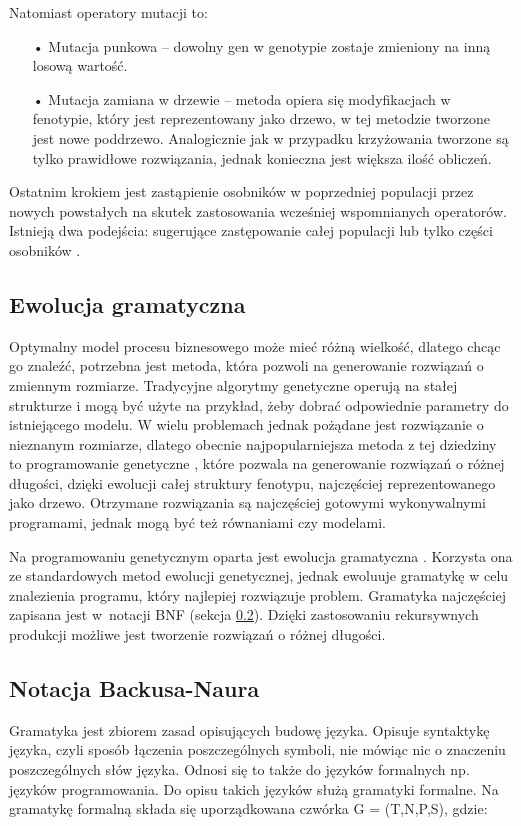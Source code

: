 Natomiast operatory mutacji to:
\begin{itemize}
\item[•] Mutacja punkowa -- dowolny gen w genotypie zostaje zmieniony na inną losową wartość.

\item[•] Mutacja zamiana w drzewie -- metoda opiera się modyfikacjach w fenotypie, który jest reprezentowany jako drzewo, w tej metodzie tworzone jest nowe poddrzewo. Analogicznie jak w przypadku krzyżowania tworzone są tylko prawidłowe rozwiązania, jednak konieczna jest większa ilość obliczeń. 
\end{itemize}

Ostatnim krokiem jest zastąpienie osobników w poprzedniej populacji przez nowych powstałych na skutek zastosowania wcześniej wspomnianych operatorów. Istnieją dwa podejścia: sugerujące zastępowanie całej populacji lub tylko części osobników \cite{SSvsGen}.


\subsection{Ewolucja gramatyczna}
Optymalny model procesu biznesowego może mieć różną wielkość, dlatego chcąc go znaleźć, potrzebna jest metoda, która pozwoli na generowanie rozwiązań o zmiennym rozmiarze. Tradycyjne algorytmy genetyczne operują na stałej strukturze i mogą być użyte na przykład, żeby dobrać odpowiednie parametry do istniejącego modelu. W wielu problemach jednak pożądane jest rozwiązanie o nieznanym rozmiarze, dlatego obecnie najpopularniejsza metoda z tej dziedziny to programowanie genetyczne \cite{Koza:1990:pat-GAsp, 10.5555/138936}, które pozwala na generowanie rozwiązań o różnej długości, dzięki ewolucji całej struktury fenotypu, najczęściej reprezentowanego jako drzewo. Otrzymane rozwiązania są najczęściej gotowymi wykonywalnymi programami, jednak mogą być też równaniami czy modelami.

Na programowaniu genetycznym oparta jest ewolucja gramatyczna \cite{ryan_collins_neill_1998}. Korzysta ona ze standardowych metod ewolucji genetycznej, jednak ewoluuje gramatykę w celu znalezienia programu, który najlepiej rozwiązuje problem. Gramatyka najczęściej zapisana jest w~notacji BNF (sekcja \ref{sec:BNF}). Dzięki zastosowaniu rekursywnych produkcji możliwe jest tworzenie rozwiązań o różnej długości. 

\subsection{Notacja Backusa-Naura}
\label{sec:BNF}
Gramatyka jest zbiorem zasad opisujących budowę języka. Opisuje syntaktykę języka, czyli sposób łączenia poszczególnych symboli, nie mówiąc nic o znaczeniu poszczególnych słów języka. Odnosi się to także do języków formalnych np. języków programowania. Do opisu takich języków służą gramatyki formalne. Na gramatykę formalną składa się uporządkowana czwórka G = (T,N,P,S), gdzie: 

